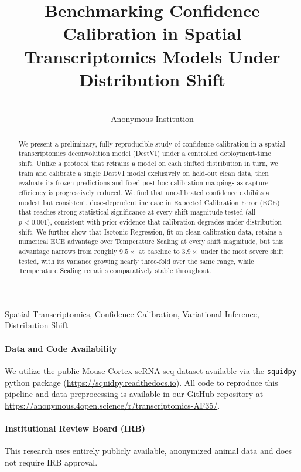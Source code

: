 \documentclass[pmlr,twocolumn,10pt]{jmlr} %
\title[Benchmarking Confidence Calibration in Spatial Transcriptomics Models Under Distribution Shift]{Benchmarking Confidence Calibration in Spatial Transcriptomics Models Under Distribution Shift}
\author{
 \Name{Anonymous Authors} \Email{anonymous@example.com}\\
 \addr Anonymous Institution
}
\begin{document}
\maketitle

\begin{abstract}
We present a preliminary, fully reproducible study of confidence calibration in a spatial transcriptomics deconvolution model (DestVI) under a controlled deployment-time shift. Unlike a protocol that retrains a model on each shifted distribution in turn, we train and calibrate a single DestVI model exclusively on held-out clean data, then evaluate its frozen predictions and fixed post-hoc calibration mappings as capture efficiency is progressively reduced. We find that uncalibrated confidence exhibits a modest but consistent, dose-dependent increase in Expected Calibration Error (ECE) that reaches strong statistical significance at every shift magnitude tested (all $p<0.001$), consistent with prior evidence that calibration degrades under distribution shift. We further show that Isotonic Regression, fit on clean calibration data, retains a numerical ECE advantage over Temperature Scaling at every shift magnitude, but this advantage narrows from roughly $9.5\times$ at baseline to $3.9\times$ under the most severe shift tested, with its variance growing nearly three-fold over the same range, while Temperature Scaling remains comparatively stable throughout.
\end{abstract}

\begin{keywords}
Spatial Transcriptomics, Confidence Calibration, Variational Inference, Distribution Shift
\end{keywords}

\paragraph*{Data and Code Availability}
We utilize the public Mouse Cortex scRNA-seq dataset available via the \texttt{squidpy} python package (\url{https://squidpy.readthedocs.io}). All code to reproduce this pipeline and data preprocessing is available in our GitHub repository at \url{https://anonymous.4open.science/r/transcriptomics-AF35/}.
\paragraph*{Institutional Review Board (IRB)}
This research uses entirely publicly available, anonymized animal data and does not require IRB approval.
\end{document}
